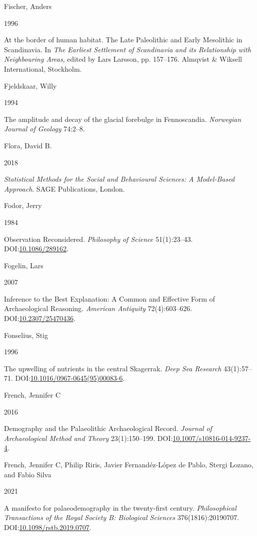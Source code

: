 \documentclass[
  12pt,
  a4paper,
  oneside]{book}
\newlength{\cslhangindent}
\newlength{\csllabelwidth}
\newlength{\cslentryspacingunit} %
\newenvironment{CSLReferences}[2] %
 {%
  \setlength{\parindent}{0pt}
  \ifodd #1
  \let\oldpar\par
  \def\par{\hangindent=\cslhangindent\oldpar}
  \fi
  \setlength{\parskip}{#2\cslentryspacingunit}
 }%
 {}
\newcommand{\CSLBlock}[1]{#1\hfill\break}
\newcommand{\CSLLeftMargin}[1]{\parbox[t]{\csllabelwidth}{#1}}
\newcommand{\CSLRightInline}[1]{\parbox[t]{\linewidth - \csllabelwidth}{#1}\break}
\begin{document}
\begin{CSLReferences}{0}{0}
\leavevmode{}%
\CSLBlock{Fischer, Anders}
\CSLLeftMargin{ 1996}
\CSLRightInline{{At the border of human habitat. The Late Paleolithic and Early Mesolithic in Scandinavia}. In \emph{{The Earliest Settlement of Scandinavia and its Relationship with Neighbouring Areas}}, edited by Lars Larsson, pp. 157--176. Almqvist \& Wiksell International, Stockholm.}

\leavevmode{}%
\CSLBlock{Fjeldskaar, Willy}
\CSLLeftMargin{ 1994}
\CSLRightInline{{The amplitude and decay of the glacial forebulge in Fennoscandia}. \emph{Norwegian Journal of Geology} 74:2--8.}

\leavevmode{}%
\CSLBlock{Flora, David B.}
\CSLLeftMargin{ 2018}
\CSLRightInline{\emph{{Statistical Methods for the Social and Behavioural Sciences: A Model-Based Approach}}. SAGE Publications, London.}

\leavevmode{}%
\CSLBlock{Fodor, Jerry}
\CSLLeftMargin{ 1984}
\CSLRightInline{Observation Reconsidered. \emph{Philosophy of Science} 51(1):23--43. DOI:\href{https://doi.org/10.1086/289162}{10.1086/289162}.}

\leavevmode{}%
\CSLBlock{Fogelin, Lars}
\CSLLeftMargin{ 2007}
\CSLRightInline{Inference to the Best Explanation: A Common and Effective Form of Archaeological Reasoning. \emph{American Antiquity} 72(4):603--626. DOI:\href{https://doi.org/10.2307/25470436}{10.2307/25470436}.}

\leavevmode{}%
\CSLBlock{Fonselius, Stig}
\CSLLeftMargin{ 1996}
\CSLRightInline{{The upwelling of nutrients in the central Skagerrak}. \emph{Deep Sea Research} 43(1):57--71. DOI:\href{https://doi.org/10.1016/0967-0645(95)00083-6}{10.1016/0967-0645(95)00083-6}.}

\leavevmode{}%
\CSLBlock{French, Jennifer C}
\CSLLeftMargin{ 2016}
\CSLRightInline{Demography and the Palaeolithic Archaeological Record. \emph{Journal of Archaeological Method and Theory} 23(1):150--199. DOI:\href{https://doi.org/10.1007/s10816-014-9237-4}{10.1007/s10816-014-9237-4}.}

\leavevmode{}%
\CSLBlock{French, Jennifer C, Philip Riris, Javier Fernandéz-López de Pablo, Stergi Lozano, and Fabio Silva}
\CSLLeftMargin{ 2021}
\CSLRightInline{A manifesto for palaeodemography in the twenty-first century. \emph{Philosophical Transactions of the Royal Society B: Biological Sciences} 376(1816):20190707. DOI:\href{https://doi.org/10.1098/rstb.2019.0707}{10.1098/rstb.2019.0707}.}


\end{CSLReferences}
\end{document}

